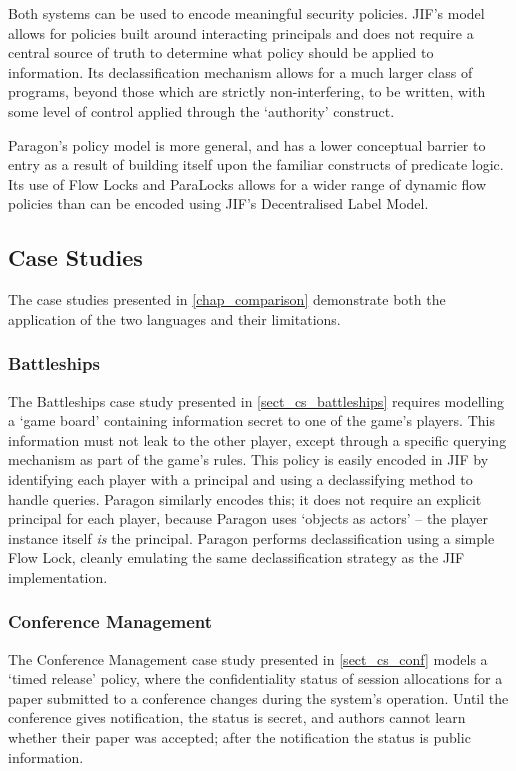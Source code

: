 Both systems can be used to encode meaningful security policies. JIF's model allows for policies built around interacting principals and does not require a central source of truth to determine what policy should be applied to information. Its declassification mechanism allows for a much larger class of programs, beyond those which are strictly non-interfering, to be written, with some level of control applied through the `authority' construct. 

Paragon's policy model is more general, and has a lower conceptual barrier to entry as a result of building itself upon the familiar constructs of predicate logic. Its use of Flow Locks and ParaLocks allows for a wider range of dynamic flow policies than can be encoded using JIF's Decentralised Label Model.

\subsection{Case Studies}

The case studies presented in \autoref{chap_comparison} demonstrate both the application of the two languages and their limitations.

\subsubsection{Battleships}

The Battleships case study presented in \ref{sect_cs_battleships} requires modelling a `game board' containing information secret to one of the game's players. This information must not leak to the other player, except through a specific querying mechanism as part of the game's rules. This policy is easily encoded in JIF by identifying each player with a principal and using a declassifying method to handle queries. Paragon similarly encodes this; it does not require an explicit principal for each player, because Paragon uses `objects as actors' -- the player instance itself \textit{is} the principal. Paragon performs declassification using a simple Flow Lock, cleanly emulating the same declassification strategy as the JIF implementation.

\subsubsection{Conference Management}

The Conference Management case study presented in \ref{sect_cs_conf} models a `timed release' policy, where the confidentiality status of session allocations for a paper submitted to a conference changes during the system's operation. Until the conference gives notification, the status is secret, and authors cannot learn whether their paper was accepted; after the notification the status is public information.

